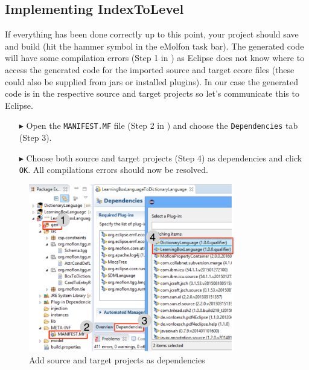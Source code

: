 \hypertarget{subsec:IndexToLevel}{}
\subsection{Implementing IndexToLevel}
\genHeader

If everything has been done correctly up to this point, your project should save and build (hit the hammer symbol in the eMolfon task bar).
The generated code will have some compilation errors (Step 1 in ) as Eclipse does not know where to access the generated code for the imported source and target ecore files (these could also be supplied from jars or installed plugins).
In our case the generated code is in the respective source and target projects so let's communicate this to Eclipse.

\begin{enumerate}

\item[$\blacktriangleright$] Open the \texttt{MANIFEST.MF} file (Step 2 in ) and choose the \texttt{De\-pen\-den\-cies} tab (Step 3).

\item[$\blacktriangleright$] Choose both source and target projects (Step 4) as dependencies and click \texttt{OK}.
All compilations errors should now be resolved.
\end{enumerate}

\begin{figure}[htb]
\begin{center}
  \includegraphics[width=0.8\textwidth]{eclipse_generatedTGG}
  \caption{Add source and target projects as dependencies}
  \label{eclipse:tggGenerated}
\end{center}
\end{figure}

